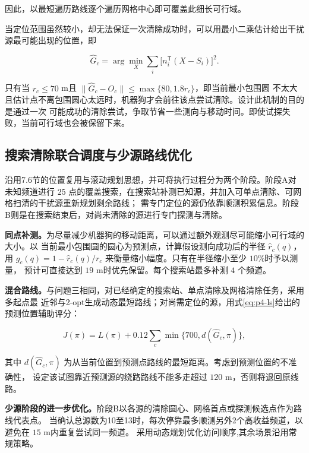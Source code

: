 \documentclass[withoutpreface,bwprint]{cumcmthesis} %
\begin{document}
因此，以最短遍历路线逐个遍历网格中心即可覆盖此细长可行域。

当定位范围虽然较小，却无法保证一次清除成功时，可以用最小二乘估计给出干扰源最可能出现的位置，即

\begin{equation}\label{eq:p4-ls}
\widehat G_c=\arg\min_X\sum_i\bigl[n_i^{\mathsf T}(X-S_i)\bigr]^2.
\end{equation}

只有当 $r_c\le70$ m且 $\|\widehat G_c-O_c\|\le\max\{80,1.8r_c\}$，即当前最小包围圆
不太大且估计点不离包围圆心太远时，机器狗才会前往该点尝试清除。设计此机制的目的是通过一次
可能成功的清除尝试，争取节省一些测向与移动时间。即使试探失败，当前可行域也会被保留下来。

\subsection{搜索清除联合调度与少源路线优化}

沿用7.6节的位置复用与滚动规划思想，并可将执行过程分为两个阶段。阶段A对未知频道进行 $25$
点的覆盖搜索，在搜索站补测已知源，并加入可单点清除、可网格扫清的干扰源重新规划剩余路线；
需专门定位的源仍依靠顺测积累信息。阶段B则是在搜索结束后，对尚未清除的源进行专门探测与清除。

\textbf{同点补测。}为尽量减少机器狗的移动距离，可以通过额外观测尽可能缩小可行域的大小。以
当前最小包围圆的圆心为预测点，计算假设测向成功后的半径 $\widehat r_c(q)$，用
$g_c(q)=1-\widehat r_c(q)/r_c$ 来衡量缩小幅度。只有在半径缩小至少 $10$\%时予以测量，
预计可直接达到 $19$ m时优先保留。每个搜索站最多补测 $4$ 个频道。

\textbf{混合路线。}与问题三相同，对已经确定的搜索站、单点清除及网格清除任务，采用多起点最
近邻与2-opt生成动态最短路线；对尚需定位的源，用式\eqref{eq:p4-ls}给出的预测位置辅助评分：

\begin{equation}\label{eq:p4-route}
J(\pi)=L(\pi)+0.12\sum_c\min\{700,d(\widehat G_c,\pi)\},
\end{equation}

其中 $d(\widehat G_c,\pi)$ 为从当前位置到预测点路线的最短距离。考虑到预测位置的不准确性，
设定该试图靠近预测源的绕路路线不能多走超过 $120$ m，否则将退回原线路。

\textbf{少源阶段的进一步优化。}阶段B以各源的清除圆心、网格首点或探测候选点作为路线代表点。
当确认总源数为10至13时，每次停靠最多顺测另外2个高收益频道，以避免在 $15$ m内重复尝试同一频道。
采用动态规划优化访问顺序,其余场景沿用常规策略。
\end{document}
